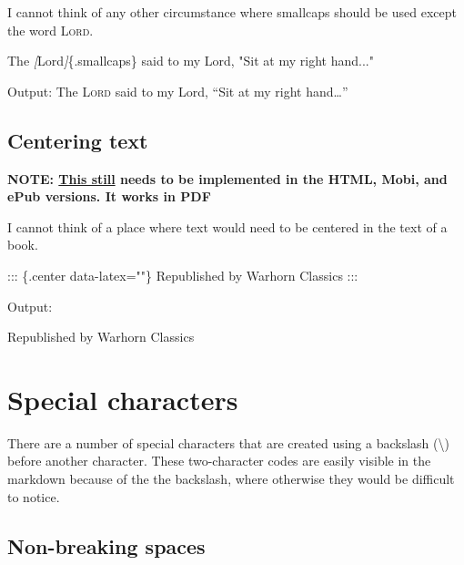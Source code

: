 \documentclass[
  english,
]{book}
\newenvironment{Shaded}{\begin{snugshade}}{\end{snugshade}}
\newcommand{\CommentTok}[1]{\textcolor[rgb]{0.56,0.35,0.01}{\textit{#1}}}
\newcommand{\NormalTok}[1]{#1}
\newcommand{\OtherTok}[1]{\textcolor[rgb]{0.56,0.35,0.01}{#1}}
\begin{document}
I cannot think of any other circumstance where smallcaps should be used except the word \textsc{Lord}.

\begin{Shaded}
\begin{Highlighting}[]
\NormalTok{The }\CommentTok{[}\OtherTok{Lord}\CommentTok{]}\NormalTok{\{.smallcaps\} said to my Lord, "Sit at my right hand..."}
\end{Highlighting}
\end{Shaded}

Output: The \textsc{Lord} said to my Lord, ``Sit at my right hand\ldots{}''

\hypertarget{centering-text}{%
\section{Centering text}\label{centering-text}}

\textbf{NOTE: \href{https://github.com/warhornmedia/classics-documentation/issues/7}{This still} needs to be implemented in the HTML, Mobi, and ePub versions. It works in PDF}

I cannot think of a place where text would need to be centered in the text of a book.

\begin{Shaded}
\begin{Highlighting}[]
\NormalTok{::: \{.center data{-}latex=""\}}
\NormalTok{Republished by Warhorn Classics}
\NormalTok{:::}
\end{Highlighting}
\end{Shaded}

Output:

\begin{center}
Republished by Warhorn Classics

\end{center}

\hypertarget{special-characters}{%
\chapter{Special characters}\label{special-characters}}

There are a number of special characters that are created using a backslash (\textbackslash) before another character. These two-character codes are easily visible in the markdown because of the the backslash, where otherwise they would be difficult to notice.

\hypertarget{non-breaking-spaces}{%
\section{Non-breaking spaces}\label{non-breaking-spaces}}
\end{document}
